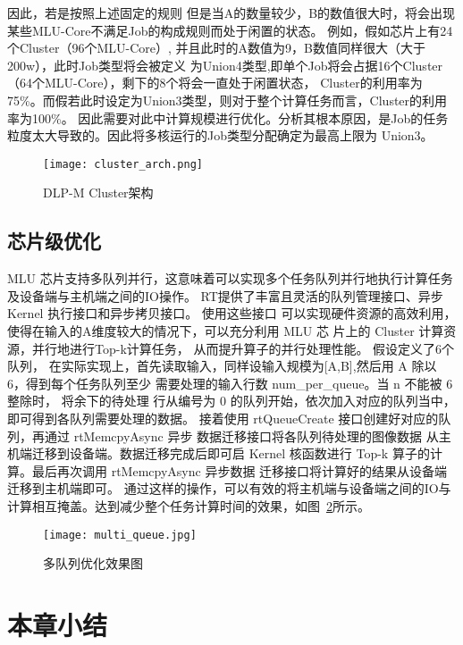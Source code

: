 因此，若是按照上述固定的规则
但是当A的数量较少，B的数值很大时，将会出现某些MLU-Core不满足Job的构成规则而处于闲置的状态。
例如，假如芯片上有24个Cluster（96个MLU-Core）, 并且此时的A数值为9，B数值同样很大（大于200w），此时Job类型将会被定义
为Union4类型,即单个Job将会占据16个Cluster（64个MLU-Core），剩下的8个将会一直处于闲置状态，
Cluster的利用率为75\%。而假若此时设定为Union3类型，则对于整个计算任务而言，Cluster的利用率为100\%。
因此需要对此中计算规模进行优化。分析其根本原因，是Job的任务粒度太大导致的。因此将多核运行的Job类型分配确定为最高上限为
Union3。

\begin{figure}[ht]
    \centering
    \texttt{[image: cluster\_arch.png]}
    \caption{DLP-M Cluster架构}
    \label{fig:cluster_arch}
\end{figure}


\subsection{芯片级优化}

MLU 芯片支持多队列并行，这意味着可以实现多个任务队列并行地执行计算任务及设备端与主机端之间的IO操作。
RT提供了丰富且灵活的队列管理接口、异步 Kernel 执行接口和异步拷贝接口。 使用这些接口
 可以实现硬件资源的高效利用，使得在输入的A维度较大的情况下，可以充分利用 MLU 芯
 片上的 Cluster 计算资源，并行地进行Top-k计算任务， 从而提升算子的并行处理性能。
 假设定义了6个队列，
在实际实现上，首先读取输入，同样设输入规模为[A,B],然后用 A 除以 6，得到每个任务队列至少
  需要处理的输入行数 num\_per\_queue。当 n 不能被 6 整除时， 将余下的待处理
  行从编号为 0 的队列开始，依次加入对应的队列当中，即可得到各队列需要处理的数据。
  接着使用 rtQueueCreate 接口创建好对应的队列，再通过 rtMemcpyAsync 异步
  数据迁移接口将各队列待处理的图像数据 从主机端迁移到设备端。数据迁移完成后即可启
   Kernel 核函数进行 Top-k 算子的计算。最后再次调用 rtMemcpyAsync 异步数据
   迁移接口将计算好的结果从设备端迁移到主机端即可。
通过这样的操作，可以有效的将主机端与设备端之间的IO与计算相互掩盖。达到减少整个任务计算时间的效果，如图~\ref{fig:multi_queue}所示。
\begin{figure}[ht]
    \centering
    \texttt{[image: multi\_queue.jpg]}
    \caption{多队列优化效果图}
    \label{fig:multi_queue}
\end{figure}

\section{本章小结}

